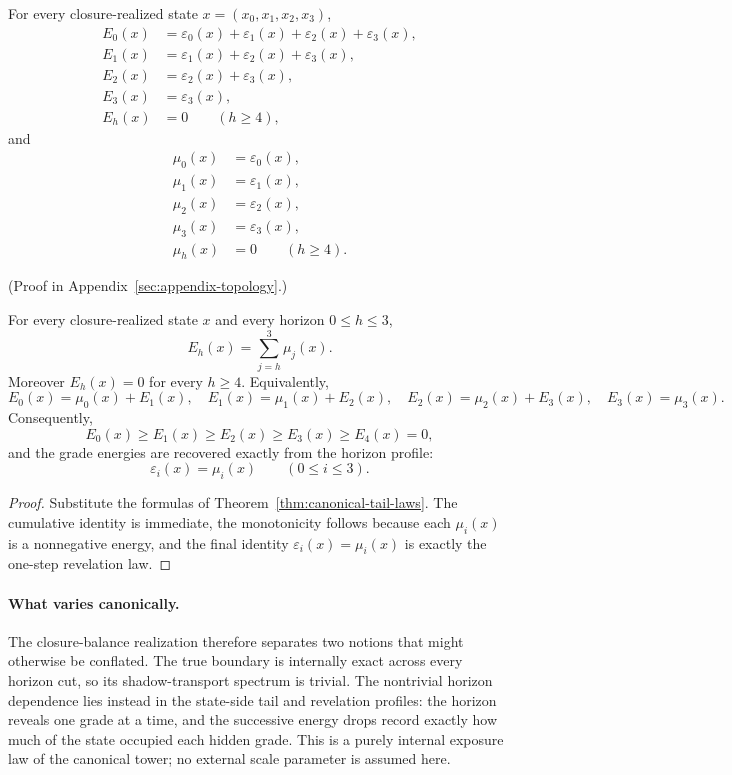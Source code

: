 \begin{theorem}
\label{thm:canonical-tail-laws}
For every closure-realized state $x=(x_0,x_1,x_2,x_3)$,
\begin{align*}
E_0(x) &= \varepsilon_0(x)+\varepsilon_1(x)+\varepsilon_2(x)+\varepsilon_3(x),\\
E_1(x) &= \varepsilon_1(x)+\varepsilon_2(x)+\varepsilon_3(x),\\
E_2(x) &= \varepsilon_2(x)+\varepsilon_3(x),\\
E_3(x) &= \varepsilon_3(x),\\
E_h(x) &= 0 \qquad (h\ge 4),
\end{align*}
and
\begin{align*}
\mu_0(x) &= \varepsilon_0(x),\\
\mu_1(x) &= \varepsilon_1(x),\\
\mu_2(x) &= \varepsilon_2(x),\\
\mu_3(x) &= \varepsilon_3(x),\\
\mu_h(x) &= 0 \qquad (h\ge 4).
\end{align*}
\end{theorem}

(Proof in Appendix~\ref{sec:appendix-topology}.)

\begin{corollary}
\label{cor:canonical-tail-reconstruction}
For every closure-realized state $x$ and every horizon $0\le h\le 3$,
\[
E_h(x)=\sum_{j=h}^{3}\mu_j(x).
\]
Moreover $E_h(x)=0$ for every $h\ge 4$.
Equivalently,
\[
E_0(x)=\mu_0(x)+E_1(x),\quad
E_1(x)=\mu_1(x)+E_2(x),\quad
E_2(x)=\mu_2(x)+E_3(x),\quad
E_3(x)=\mu_3(x).
\]
Consequently,
\[
E_0(x)\ge E_1(x)\ge E_2(x)\ge E_3(x)\ge E_4(x)=0,
\]
and the grade energies are recovered exactly from the horizon profile:
\[
\varepsilon_i(x)=\mu_i(x)
\qquad (0\le i\le 3).
\]
\end{corollary}

\begin{proof}
Substitute the formulas of Theorem~\ref{thm:canonical-tail-laws}. The
cumulative identity is immediate, the monotonicity follows because each
$\mu_i(x)$ is a nonnegative energy, and the final identity
$\varepsilon_i(x)=\mu_i(x)$ is exactly the one-step revelation law.
\end{proof}

\paragraph{What varies canonically.}
The closure-balance realization therefore separates two notions that might
otherwise be conflated. The true boundary is internally exact across every
horizon cut, so its shadow-transport spectrum is trivial. The nontrivial
horizon dependence lies instead in the state-side tail and revelation
profiles: the horizon reveals one grade at a time, and the successive energy
drops record exactly how much of the state occupied each hidden grade. This is
a purely internal exposure law of the canonical tower; no external scale
parameter is assumed here.

